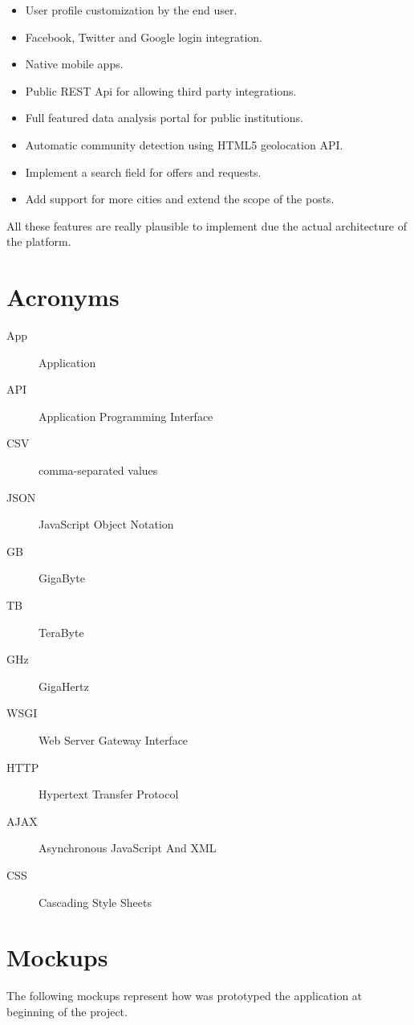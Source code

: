 \documentclass{DeustoFDP}
\begin{document}
\begin{itemize}
	\item User profile customization by the end user.
	\item Facebook, Twitter and Google login integration.
	\item Native mobile apps.
	\item Public REST Api for allowing third party integrations.
	\item Full featured data analysis portal for public institutions.
	\item Automatic community detection using HTML5 geolocation API.
	\item Implement a search field for offers and requests.
	\item Add support for more cities and extend the scope of the posts.
\end{itemize}

All these features are really plausible to implement due the actual architecture of the platform.

\printbibliography[heading=bibintoc]
\chapter{Acronyms}\label{cha:acronyms}
\begin{description}
	\item[App] Application
	\item[API] Application Programming Interface
	\item[CSV] comma-separated values
	\item[JSON] JavaScript Object Notation
	\item[GB] GigaByte
	\item[TB] TeraByte
	\item[GHz] GigaHertz
	\item[WSGI] Web Server Gateway Interface
	\item[HTTP] Hypertext Transfer Protocol 
	\item[AJAX] Asynchronous JavaScript And XML
	\item[CSS] Cascading Style Sheets
\end{description}

\appendix

\chapter{Mockups}\label{cha:mockups}
The following mockups represent how was prototyped the application at beginning of the project.
\end{document}
